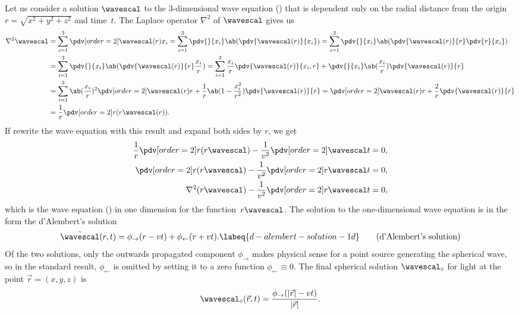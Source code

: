 Let us consider a solution \(\wavescal\) to the \(3\)-dimensional wave equation () that is dependent
    only on the radial distance from the \linebreak origin \({r = \sqrt{x^2 + y^2 + z^2}}\) and time~\(t\).
The Laplace operator \(\nabla^2\) of \(\wavescal\) gives us
    \begin{align*}
        \nabla^2\wavescal &= \sum_{i = 1}^{3} \pdv[order={2}]{\wavescal(r)}{x_i}  = \sum_{i = 1}^{3}
        \pdv{}{x_i}\ab(\pdv{\wavescal(r)}{x_i}) = \sum_{i = 1}^{3} \pdv{}{x_i}\ab(\pdv{\wavescal(r)}{r}\pdv{r}{x_i}) \\
                      &= \sum_{i = 1}^{3} \pdv{}{x_i}\ab(\pdv{\wavescal(r)}{r}\frac{x_i}{r}) 
                      = \sum_{i = 1}^{3} \frac{x_i}{r} \pdv{\wavescal(r)}{x_i, r}
                      + \pdv{}{x_i}\ab(\frac{x_i}{r})\pdv{\wavescal(r)}{r} \\
                      &= \sum_{i = 1}^{3} \ab(\frac{x_i}{r})^2 \pdv[order={2}]{\wavescal(r)}{r} + \frac{1}{r}\ab(1
                      - \frac{x_i^2}{r^2}) \pdv{\wavescal(r)}{r} = \pdv[order={2}]{\wavescal(r)}{r}
        + \frac{2}{r}\pdv{\wavescal(r)}{r} \\
                      &= \frac{1}{r}\pdv[order={2}]{}{r}(r\wavescal(r)).
    \end{align*}
If rewrite the wave equation with this result and expand both sides by \(r\), we get 
    \begin{align*}
        \frac{1}{r}\pdv[order={2}]{}{r}(r\wavescal) - \frac{1}{v^2}\pdv[order={2}]{\wavescal}{t} &= 0, \\
        \pdv[order={2}]{}{r}(r\wavescal) - \frac{1}{v^2}\pdv[order={2}]{r\wavescal}{t} &= 0, \\
        \nabla^2(r\wavescal) - \frac{1}{v^2}\pdv[order={2}]{r\wavescal}{t} &= 0, \\
    \end{align*}
    which is the wave equation () in one dimension for the function~\(r\wavescal\).
The solution to the one-dimensional wave equation is in the form the d'Alembert's solution
    \begin{equation}
        \tilde{\wavescal}(r,t) = \phi_{\rightarrow}(r - vt) + \phi_{\leftarrow}(r + vt). \labeq{d-alembert-solution-1d}
        \tag{d'Alembert's solution}
    \end{equation}
Of the two solutions, only the outwards propagated component \(\phi_{\rightarrow}\) makes physical sense for a point 
    source generating the spherical wave, so in the standard result, \(\phi_{\leftarrow}\) is omitted by setting it to a zero function 
    \(\phi_{\leftarrow} \equiv 0\).
The final spherical solution \(\wavescal_{\circ}\) for light at the point \(\vec{r}=(x,y,z)\) is
    \begin{equation}
        \wavescal_\circ(\vec{r},t) = \frac{\phi_{\rightarrow}(|\vec{r}| - vt)}{|\vec{r}|}.
    \end{equation}

